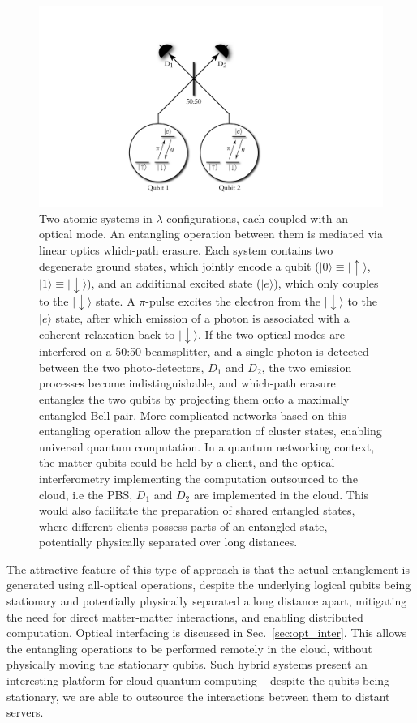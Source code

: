 \documentclass[aps,rmp,twocolumn,amsmath,amssymb,nofootinbib,superscriptaddress,longbibliography,floatfix,table-of-contents,eqsecnum]{revtex4-1}
\newcommand{\ket}[1]{|#1\rangle}
\begin{document}
\begin{figure}[!htb]
\includegraphics[width=0.75\columnwidth]{barrett_kok}
\caption{Two atomic systems in $\lambda$-configurations, each coupled with an optical mode. An entangling operation between them is mediated via linear optics which-path erasure. Each system contains two degenerate ground states, which jointly encode a qubit (\mbox{$\ket{0}\equiv\ket{\!\uparrow}$}, \mbox{$\ket{1}\equiv\ket{\!\downarrow}$}), and an additional excited state ($\ket{e}$), which only couples to the $\ket{\!\downarrow}$ state. A $\pi$-pulse excites the electron from the $\ket{\!\downarrow}$ to the $\ket{e}$ state, after which emission of a photon is associated with a coherent relaxation back to $\ket{\!\downarrow}$. If the two optical modes are interfered on a 50:50 beamsplitter, and a single photon is detected between the two photo-detectors, $D_1$ and $D_2$, the two emission processes become indistinguishable, and which-path erasure entangles the two qubits by projecting them onto a maximally entangled Bell-pair. More complicated networks based on this entangling operation allow the preparation of cluster states, enabling universal quantum computation. In a quantum networking context, the matter qubits could be held by a client, and the optical interferometry implementing the computation outsourced to the cloud, i.e the PBS, $D_1$ and $D_2$ are implemented in the cloud. This would also facilitate the preparation of shared entangled states, where different clients possess parts of an entangled state, potentially physically separated over long distances.} \label{fig:barrett_kok}
\end{figure}

The attractive feature of this type of approach is that the actual entanglement is generated using all-optical operations, despite the underlying logical qubits being stationary and potentially physically separated a long distance apart, mitigating the need for direct matter-matter interactions, and enabling distributed computation. Optical interfacing is discussed in Sec.~\ref{sec:opt_inter}. This allows the entangling operations to be performed remotely in the cloud, without physically moving the stationary qubits. Such hybrid systems present an interesting platform for cloud quantum computing -- despite the qubits being stationary, we are able to outsource the interactions between them to distant servers.
\end{document}
